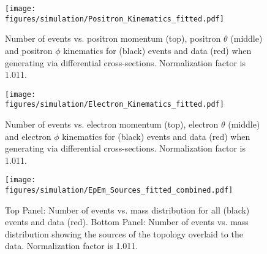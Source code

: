 				\begin{figure}[h!]\begin{center}
						\texttt{[image: \\figures/simulation/Positron\_Kinematics\_fitted.pdf]}
						\caption[Number of events vs. positron momentum (top), positron $\theta$ (middle) and positron $\phi$ kinematics for  (black) events and data (red) when generating  via differential cross-sections]{\label{fig:simsmear.Ep}Number of events vs. positron momentum (top), positron $\theta$ (middle) and positron $\phi$ kinematics for  (black) events and data (red) when generating  via differential cross-sections. Normalization factor is 1.011.}
					\end{center}\end{figure} 
					\begin{figure}[h!]\begin{center}
							\texttt{[image: \\figures/simulation/Electron\_Kinematics\_fitted.pdf]}
							\caption[Number of events vs. electron momentum (top), electron $\theta$ (middle) and electron $\phi$ kinematics for  (black) events and data (red) when generating  via differential cross-sections]{\label{fig:simsmear.Em}Number of events vs. electron momentum (top), electron $\theta$ (middle) and electron $\phi$ kinematics for  (black) events and data (red) when generating  via differential cross-sections. Normalization factor is 1.011. }
						\end{center}\end{figure} 
						\begin{figure}[h!]\begin{center}
								\texttt{[image: \\figures/simulation/EpEm\_Sources\_fitted\_combined.pdf]}
								\caption[Number of events vs. \epemT mass distribution for all  (black) events and data (red)]{\label{fig:simsmear.EpEm}Top Panel: Number of events vs. \epemT mass distribution for all  (black) events and data (red). Bottom Panel: Number of events vs. \epemT mass distribution showing the sources of the  \epemT topology overlaid to the data. Normalization factor is 1.011.}
							\end{center}\end{figure} 
							
							\FloatBarrier